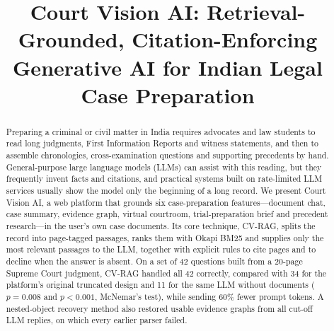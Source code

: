 \documentclass[conference]{IEEEtran}
\begin{document}
\title{Court Vision AI: Retrieval-Grounded, Citation-Enforcing Generative AI for Indian Legal Case Preparation}

\author{
\and
{}
}

\maketitle

\begin{abstract}
Preparing a criminal or civil matter in India requires advocates and law students to read long judgments, First Information Reports and witness statements, and then to assemble chronologies, cross-examination questions and supporting precedents by hand. General-purpose large language models (LLMs) can assist with this reading, but they frequently invent facts and citations, and practical systems built on rate-limited LLM services usually show the model only the beginning of a long record. We present Court Vision AI, a web platform that grounds six case-preparation features---document chat, case summary, evidence graph, virtual courtroom, trial-preparation brief and precedent research---in the user's own case documents. Its core technique, CV-RAG, splits the record into page-tagged passages, ranks them with Okapi BM25 and supplies only the most relevant passages to the LLM, together with explicit rules to cite pages and to decline when the answer is absent. On a set of 42 questions built from a 20-page Supreme Court judgment, CV-RAG handled all 42 correctly, compared with 34 for the platform's original truncated design and 11 for the same LLM without documents ($p=0.008$ and $p<0.001$, McNemar's test), while sending 60\% fewer prompt tokens. A nested-object recovery method also restored usable evidence graphs from all cut-off LLM replies, on which every earlier parser failed.
\end{abstract}
\end{document}
